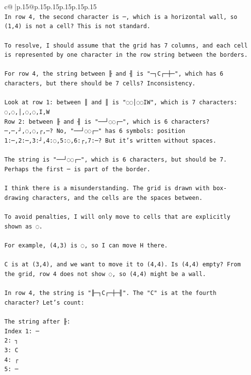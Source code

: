 \documentclass{article}
\begin{document}
{\begin{supertabular}{c@{$\;$}|p{.15\linewidth}@{}p{.15\linewidth}p{.15\linewidth}p{.15\linewidth}p{.15\linewidth}p{.15\linewidth}}
{{{\\ 
\texttt{In row 4, the second character is ─, which is a horizontal wall, so (1,4) is not a cell? This is not standard.} \\
\\ 
\texttt{To resolve, I should assume that the grid has 7 columns, and each cell is represented by one character in the row string between the borders.} \\
\\ 
\texttt{For row 4, the string between ╟ and ╢ is "─┐C┌─┼─", which has 6 characters, but there should be 7 cells? Inconsistency.} \\
\\ 
\texttt{Look at row 1: between ║ and ║ is "◌◌│◌◌IW", which is 7 characters: ◌,◌,│,◌,◌,I,W} \\
\texttt{Row 2: between ╟ and ╢ is "──┘◌◌┌─", which is 6 characters? ─,─,┘,◌,◌,┌,─? No, "──┘◌◌┌─" has 6 symbols: position 1:─,2:─,3:┘,4:◌,5:◌,6:┌,7:─? But it's written without spaces.} \\
\\ 
\texttt{The string is "──┘◌◌┌─", which is 6 characters, but should be 7. Perhaps the first ─ is part of the border.} \\
\\ 
\texttt{I think there is a misunderstanding. The grid is drawn with box{-}drawing characters, and the cells are the spaces between.} \\
\\ 
\texttt{To avoid penalties, I will only move to cells that are explicitly shown as ◌.} \\
\\ 
\texttt{For example, (4,3) is ◌, so I can move H there.} \\
\\ 
\texttt{C is at (3,4), and we want to move it to (4,4). Is (4,4) empty? From the grid, row 4 does not show ◌, so (4,4) might be a wall.} \\
\\ 
\texttt{In row 4, the string is "╟─┐C┌─┼─╢". The "C" is at the fourth character? Let's count:} \\
\\ 
\texttt{The string after ╟: } \\
\texttt{Index 1: ─} \\
\texttt{2: ┐} \\
\texttt{3: C} \\
\texttt{4: ┌} \\
\texttt{5: ─} \\
}}}
\end{supertabular}}
\end{document}
